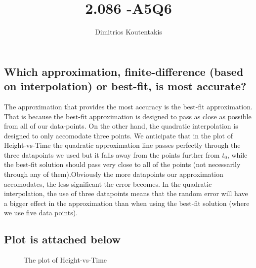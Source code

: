 \documentclass[14pt]{article}
\title{2.086 -A5Q6 }
\author{Dimitrios Koutentakis}
\date{}
\begin{document}
\maketitle

\subsection*{Which approximation, finite-difference (based on interpolation) or best-fit, is most accurate?}


The approximation that provides the most accuracy is the best-fit approximation. That is because the best-fit approximation is designed to pass as close as possible from all of our data-points. On the other hand, the quadratic interpolation is designed to only accomodate three points. We anticipate that in the plot of Height-vs-Time the quadratic approximation line passes perfectly through the three datapoints we used but it falls away from the points further from $t_0$, while the best-fit solution should pass very close to all of the points (not necessarily through any of them).Obviously the more datapoints our approximation accomodates, the less significant the error becomes. In the quadratic interpolation, the use of three datapoints means that the random error will have a bigger effect in the approximation than when using the best-fit solution (where we use five data points).\\

\subsection*{Plot is attached below}

\begin{figure}[b!]
\centering 
\newlength\figureheight
 \newlength\figurewidth 
\setlength\figureheight{6cm}
 \setlength\figurewidth{12.5cm} 
 
\caption{The plot of Height-vs-Time}

\end{figure}
\end{document}
